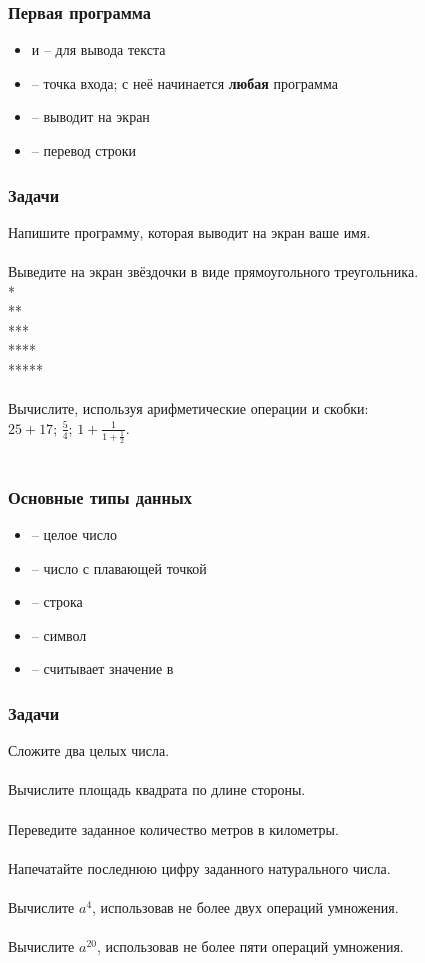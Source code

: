 \documentclass[PDF,10pt,usenames,dvipsnames,t,fragile]{beamer}
\newcommand{\bigqm}[1][1]{\text{\rm\larger[#1]{\textbf{?}}}}
\newcommand{\prblm}[1]{{\bigqm[1]} {#1 \\} \vspace{-6pt} \\} %
\begin{document}
\begin{frame}[fragile]
	\frametitle{Первая программа}
	\begin{itemize}
		\item	{} и  -- для вывода текста
		\item	{} -- точка входа; с неё начинается {\bf любая} программа
		\item	{} -- выводит  на экран
		\item	{} -- перевод строки
	\end{itemize}
\end{frame}

\begin{frame}
	\frametitle{Задачи}
	\prblm{Напишите программу, которая выводит на экран ваше имя.}
	\prblm{Выведите на экран звёздочки в виде прямоугольного треугольника. \\ *\\ ** \\ *** \\ **** \\ *****}
	\prblm{Вычислите, используя арифметические операции и скобки: \\ \vspace{5pt} $25+17$; \hspace{12pt} $\frac{5}{4}$; \hspace{12pt} $1+\frac{1}{1+\frac{1}{2}}$.}
\end{frame}

\begin{frame}
	\frametitle{Основные типы данных} 
	\begin{itemize}
		\item {} -- целое число
		\item {} -- число с плавающей точкой
		\item {} -- строка
		\item {} -- символ
		\item	{} -- считывает значение в 
	\end{itemize}
\end{frame}

\begin{frame}
	\frametitle{Задачи}
	\prblm{Сложите два целых числа.}
	\prblm{Вычислите площадь квадрата по длине стороны.}
	\prblm{Переведите заданное количество метров в километры.}
	\prblm{Напечатайте последнюю цифру заданного натурального числа.}
	\prblm{Вычислите $a^4$, использовав не более двух операций умножения.}
	\prblm{Вычислите $a^{20}$, использовав не более пяти операций умножения.}
\end{frame}
\end{document}
